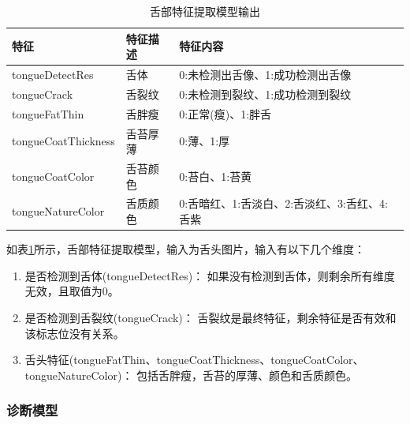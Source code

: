 \begin{table}[h]
    \centering
    \caption{舌部特征提取模型输出}
    \begin{tabular}{lll}
        \toprule
        特征 & 特征描述 & 特征内容 \\ 
        \midrule
        tongueDetectRes & 舌体 & 0:未检测出舌像、1:成功检测出舌像 \\
        tongueCrack & 舌裂纹 & 0:未检测到裂纹、1:成功检测到裂纹 \\ 
        tongueFatThin & 舌胖瘦 & 0:正常(瘦)、1:胖舌 \\
        tongueCoatThickness & 舌苔厚薄 & 0:薄、1:厚 \\
        tongueCoatColor & 舌苔颜色 & 0:苔白、1:苔黄 \\
        tongueNatureColor & 舌质颜色 & 0:舌暗红、1:舌淡白、2:舌淡红、3:舌红、4:舌紫\\
        \bottomrule
    \end{tabular}
    \label{tab:tongue-feature}
\end{table}

如表\ref{tab:tongue-feature}所示，舌部特征提取模型，输入为舌头图片，输入有以下几个维度：
\begin{enumerate}
    \item 是否检测到舌体(tongueDetectRes)： 如果没有检测到舌体，则剩余所有维度无效，且取值为0。

    \item 是否检测到舌裂纹(tongueCrack)： 舌裂纹是最终特征，剩余特征是否有效和该标志位没有关系。

    \item 舌头特征(tongueFatThin、tongueCoatThickness、tongueCoatColor、tongueNatureColor)： 包括舌胖瘦，舌苔的厚薄、颜色和舌质颜色。

\end{enumerate}

\subsubsection{诊断模型}
\label{subsection:diag}

